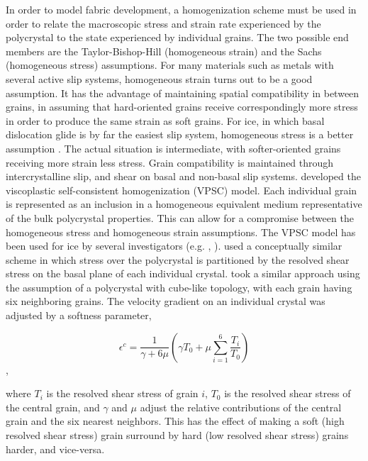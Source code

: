 \documentclass{igs}
\begin{document}
In order to model fabric development, a homogenization scheme must be used in order to relate the macroscopic stress and strain rate experienced by the polycrystal to the state experienced by individual grains. The two possible end members are the Taylor-Bishop-Hill (homogeneous strain) \citep{taylor} and the Sachs (homogeneous stress) \citep{sachs} assumptions. For many materials such as metals with several active slip systems, homogeneous strain turns out to be a good assumption. It has the advantage of maintaining spatial compatibility in between grains, in assuming that hard-oriented grains receive correspondingly more stress in order to produce the same strain as soft grains. For ice, in which basal dislocation glide is by far the easiest slip system, homogeneous stress is a better assumption \citep{thorsteinsson2002nni}. The actual situation is intermediate, with softer-oriented grains receiving more strain less stress. Grain compatibility is maintained through intercrystalline slip, and shear on basal and non-basal slip systems. \citet{molinari} developed the viscoplastic self-consistent homogenization (VPSC) model. Each individual grain is represented as an inclusion in a homogeneous equivalent medium representative of the bulk polycrystal properties. This can allow for a compromise between the homogeneous stress and homogeneous strain assumptions. The VPSC model has been used for ice by several investigators (e.g. \citet{gillet2005}, \citet{castelnau1997}). \citet{azuma96} used a conceptually similar scheme in which stress over the polycrystal is partitioned by the resolved shear stress on the basal plane of each individual crystal. \citet{thorsteinsson2002nni} took a similar approach using the assumption of a polycrystal with cube-like topology, with each grain having six neighboring grains. The velocity gradient on an individual crystal was adjusted by a softness parameter,

\begin{equation}
\epsilon^c = \frac {1}{\gamma + 6 \mu} \left( \gamma T_0 + \mu \sum_{i=1}^6 \frac{T_i}{T_0} \right)
\end{equation},

where $T_i$ is the resolved shear stress of grain $i$, $T_0$ is the resolved shear stress of the central grain, and $\gamma$ and $\mu$ adjust the relative contributions of the central grain and the six nearest neighbors. This has the effect of making a soft (high resolved shear stress) grain surround by hard (low resolved shear stress) grains harder, and vice-versa.
\end{document}

